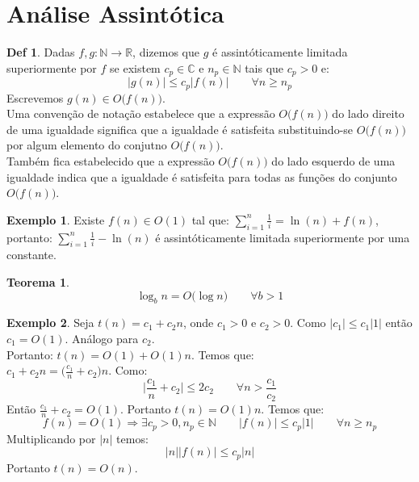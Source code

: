 \documentclass[a4paper,11pt]{article}
\theoremstyle{definition} \newtheorem{definicao}{Def}
\theoremstyle{definition} \newtheorem{exemplo}{Exemplo}
\theoremstyle{plain}      \newtheorem{teorema}{Teorema}
\theoremstyle{remark}     \newtheorem*{corolario}{Corol\'{a}rio}
\begin{document}
\section{An\'{a}lise Assint\'{o}tica}

\begin{definicao}
Dadas $f,g: \mathbb{N} \longrightarrow \mathbb{R}$, dizemos que
$g$ \'{e} assint\'{o}ticamente limitada superiormente por $f$ se
existem $c_p \in \mathbb{C}$ e $n_p \in \mathbb{N}$ tais que
$c_p > 0$ e:
\begin{equation*}
|g(n)| \leq c_p|f(n)| \qquad \forall n \geq n_p
\end{equation*}
Escrevemos $g(n) \in O\big(f(n)\big)$. \\
Uma conven\c{c}\~{a}o de nota\c{c}\~{a}o estabelece que a
express\~{a}o $O\big(f(n)\big)$ do lado direito de uma
igualdade significa que a igualdade \'{e} satisfeita
substituindo-se $O\big(f(n)\big)$ por algum elemento
do conjutno $O\big(f(n)\big)$. \\
Tamb\'{e}m fica estabelecido que a express\~{a}o $O\big(f(n)\big)$
do lado esquerdo de uma igualdade indica que a igualdade \'{e}
satisfeita para todas as fun\c{c}\~{o}es do conjunto $O\big(f(n)\big)$.
\end{definicao}

\begin{exemplo}
Existe $f(n) \in O(1)$ tal que:
$\sum _{i=1}^{n}\frac{1}{i} = \ln(n) + f(n)$, portanto:
$\sum _{i=1}^{n}\frac{1}{i} - \ln(n)$ \'{e} assint\'{o}ticamente
limitada superiormente por uma constante.
\end{exemplo}

\begin{teorema}
\begin{equation*}
\log _b n  = O\big(\log n \big) \qquad \forall b > 1
\end{equation*}
\end{teorema}

\begin{exemplo}
Seja $t(n) = c_1+c_2n$, onde $c_1>0$ e $c_2>0$.
Como $|c_1| \leq c_1|1|$ ent\~{a}o $c_1 = O(1)$. An\'{a}logo para $c_2$.\\
Portanto: $t(n) = O(1) +O(1)n$. Temos que: \\
$c_1 + c_2n = \big(\frac{c_1}{n} + c_2\big)n$. Como:
\begin{equation*}
\Big| \frac{c_1}{n} + c_2\Big| \leq 2c_2 \qquad
\forall n > \frac{c_1}{c_2}
\end{equation*}
Ent\~{a}o $\frac{c_1}{n} + c_2 = O(1)$. Portanto $t(n)=O(1)n$. Temos que:
\begin{equation*}
f(n)=O(1) \Rightarrow  \exists c_p > 0, n_p \in \mathbb{N} \qquad
|f(n)| \leq c_p|1| \qquad \forall n \geq n_p
\end{equation*}
Multiplicando por $|n|$ temos:
\begin{equation*}
|n| |f(n)| \leq c_p|n|
\end{equation*}
Portanto $t(n) = O(n)$.
\end{exemplo}
\end{document}
